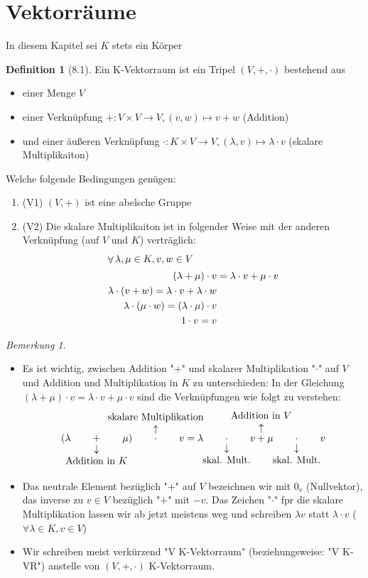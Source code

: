 \documentclass[a4paper]{scrartcl}
\DeclareMathOperator{\Forall}{\forall}
\theoremstyle{definition}
\newtheorem{defn}{Definition}
\theoremstyle{plain}
\theoremstyle{plain}
\theoremstyle{remark}
\newtheorem{remark}{Bemerkung}
\theoremstyle{remark}
\theoremstyle{remark}
\begin{document}
\section{Vektorräume}
\label{sec-5}
In diesem Kapitel sei $K$ stets ein Körper
\begin{defn}[8.1]
Ein K-Vektorraum ist ein Tripel $(V,+,\cdot)$ bestehend aus
\begin{itemize}
\item einer Menge $V$
\item einer Verknüpfung $+:V\times V \to V, (v,w)\mapsto v + w$ \hfill (Addition)
\item und einer äußeren Verknüpfung $\cdot : K\times V \to V, (\lambda,v) \mapsto \lambda \cdot v$ \hfill (skalare Multiplikaiton)
\end{itemize}
Welche folgende Bedingungen genügen:
\begin{enumerate}
\item (V1) $(V,+)$ ist eine abelsche Gruppe
\item (V2) Die skalare Multiplikaiton ist in folgender Weise mit der anderen Verknüpfung (auf $V$ und $K$) verträglich:
\begin{align*}
\intertext{$\Forall \lambda,\mu \in K, v,w\in V$}
(\lambda + \mu) \cdot v  &= \lambda \cdot v + \mu \cdot v \\
\lambda \cdot (v + w) = \lambda \cdot v + \lambda \cdot w \\
\lambda \cdot (\mu \cdot w) = (\lambda \cdot \mu) \cdot v \\
1\cdot v = v
\end{align*}
\end{enumerate}
\end{defn}
\begin{remark}
\begin{itemize}
\item Es ist wichtig, zwischen Addition "$+$" und skalarer Multiplikation "$\cdot$" auf $V$ und Addition und Multiplikation in $K$ zu unterschieden:
In der Gleichung $(\lambda + \mu) \cdot v = \lambda \cdot v + \mu\cdot v$ sind die Verknüpfungen wie folgt zu verstehen:
\[(\lambda \qquad\underarrow[+]{Addition in $K$}\qquad \mu) \qquad \overarrow[\cdot]{skalare Multiplikation} \qquad v = \lambda \qquad \underarrow[\cdot]{skal. Mult.} \qquad v \overarrow[+]{Addition in $V$} \mu\qquad\underarrow[\cdot]{skal. Mult.} \qquad v\]
\item Das neutrale Element bezüglich "$+$" auf $V$ bezeichnen wir mit $0_v$ (Nullvektor), das inverse zu $v\in V$ bezüglich "$+$" mit $-v$. Das Zeichen "$\cdot$" fpr die skalare Multiplikation lassen wir ab jetzt meistens weg und schreiben $\lambda v$ statt $\lambda\cdot v$ ($\Forall \lambda\in K, v\in V$)
\item Wir schreiben meist verkürzend "V K-Vektorraum" (beziehungsweise: "V K-VR") anstelle von $(V,+,\cdot)$ K-Vektorraum.
\end{itemize}
\end{remark}
\end{document}

